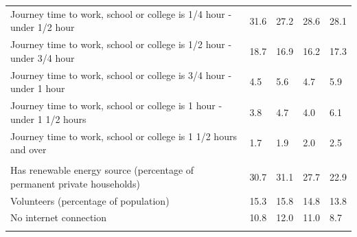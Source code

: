 \documentclass{article}
\begin{document}
\begin{table}[h]
\begin{tabular}{KTTTT}
Journey time to work, school or college is 1/4 hour - under 1/2 hour & 31.6& 27.2& 28.6& 28.1\\
Journey time to work, school or college is 1/2 hour - under 3/4 hour & 18.7& 16.9& 16.2& 17.3\\
Journey time to work, school or college is 3/4 hour - under 1 hour & 4.5& 5.6& 4.7& 5.9\\
Journey time to work, school or college is 1 hour - under 1 1/2 hours & 3.8& 4.7& 4.0& 6.1\\
Journey time to work, school or college is 1 1/2 hours and over & 1.7& 1.9& 2.0& 2.5\\
\hline
    \\ 
    \hline
Has renewable energy source (percentage of permanent private households) & 30.7& 31.1& 27.7& 22.9\\
    \hline
Volunteers (percentage of population) & 15.3& 15.8& 14.8& 13.8\\
    \hline
No internet connection& 10.8& 12.0& 11.0&  8.7\\
\hline
\end{tabular}
\end{table}
\end{document}
